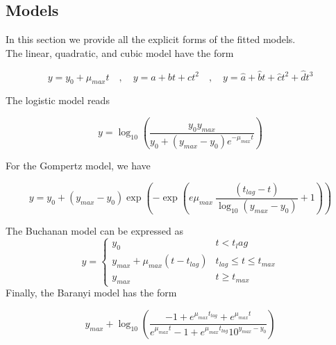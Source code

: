 \documentclass[titlepage,11pt]{article}
\begin{document}
\begin{linenumbers}
		\subsection{Models}\label{subsec:modelequations}
		In this section we provide all the explicit forms of the fitted models.\\
		The linear, quadratic, and cubic model have the form
		\begin{linenomath*}
			\begin{equation}
					y = y_0 + \mu_{max}t \quad , \quad 	y = a + bt + ct^2 \quad, \quad y = \hat{a}+ \hat{b}t + \hat{c}t^2 + \hat{d}t^3
			\end{equation}
		\end{linenomath*}
	The logistic model reads
		\begin{linenomath*}
		\begin{equation}
		y = 	\log_{10}\left(\dfrac{y_0y_{max}}{y_0 + (y_{max}-y_0)e^{-\mu_{max}t}}\right)
		\end{equation}
	\end{linenomath*}
	For the Gompertz model, we have
		\begin{linenomath*}
			\begin{equation}
				y = y_0 + (y_{max}-y_0)\exp\left(-\exp\left(e\mu_{max}\ \dfrac{(t_{lag}-t)}{\log_{10}(y_{max}-y_0)}+1\right)\right)
			\end{equation}
		\end{linenomath*}

The Buchanan model can be expressed as 
			\[y = \left\{
			\begin{array}{lr}
			y_0 &  t < t_lag\\
			y_{max}  + \mu_{max}(t-t_{lag})&  t_{lag} \le t \le t_{max}\\
			y_{max} & t \geq t_{max}
			\end{array}
			\right.
			\]
Finally, the Baranyi model has the form

		\begin{linenomath*}
			\begin{equation}				
				y_{max} + \log_{10}\left(\dfrac{-1 + e^{\mu_{max}t_{lag}} + e^{\mu_{max}t}}{e^{\mu_{max}t}-1+e^{\mu_{max}t_{lag}}10^{y_{max}-y_0}}\right)
			\end{equation}
		\end{linenomath*}
	
		

\end{linenumbers}
\end{document}
